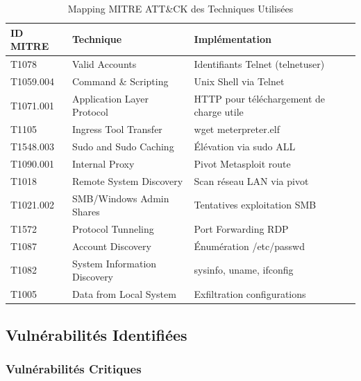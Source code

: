 \documentclass[12pt,a4paper,openany]{report}
\newcommand{\tableheadcolor}{\rowcolor{tableheadbg}}
\begin{document}
	\begin{table}[H]
		\centering
		\small
		\renewcommand{\arraystretch}{1.3}
		\setlength{\arrayrulewidth}{0.5pt}
		\begin{tabular}{>{\ttfamily}p{3cm} p{4.5cm} p{5cm}}
			\arrayrulecolor{tableborder}
			\hline
			\tableheadcolor
			\textcolor{tableheadfg}{\textbf{ID MITRE}} &
			\textcolor{tableheadfg}{\textbf{Technique}} &
			\textcolor{tableheadfg}{\textbf{Implémentation}} \\
			\hline
			\rowcolor{tablerowalt}
			T1078 & Valid Accounts & Identifiants Telnet (telnetuser) \\
			T1059.004 & Command \& Scripting & Unix Shell via Telnet \\
			\rowcolor{tablerowalt}
			T1071.001 & Application Layer Protocol & HTTP pour téléchargement de charge utile \\
			T1105 & Ingress Tool Transfer & wget meterpreter.elf \\
			\rowcolor{tablerowalt}
			T1548.003 & Sudo and Sudo Caching & Élévation via sudo ALL \\
			T1090.001 & Internal Proxy & Pivot Metasploit route \\
			\rowcolor{tablerowalt}
			T1018 & Remote System Discovery & Scan réseau LAN via pivot \\
			T1021.002 & SMB/Windows Admin Shares & Tentatives exploitation SMB \\
			\rowcolor{tablerowalt}
			T1572 & Protocol Tunneling & Port Forwarding RDP \\
			T1087 & Account Discovery & Énumération /etc/passwd \\
			\rowcolor{tablerowalt}
			T1082 & System Information Discovery & sysinfo, uname, ifconfig \\
			T1005 & Data from Local System & Exfiltration configurations \\
			\hline
		\end{tabular}
		\caption{Mapping MITRE ATT\&CK des Techniques Utilisées}
		\label{tab:mitre-attack}
	\end{table}
	
	\subsection{Vulnérabilités Identifiées}
	
	\subsubsection{Vulnérabilités Critiques}
	
\end{document}
